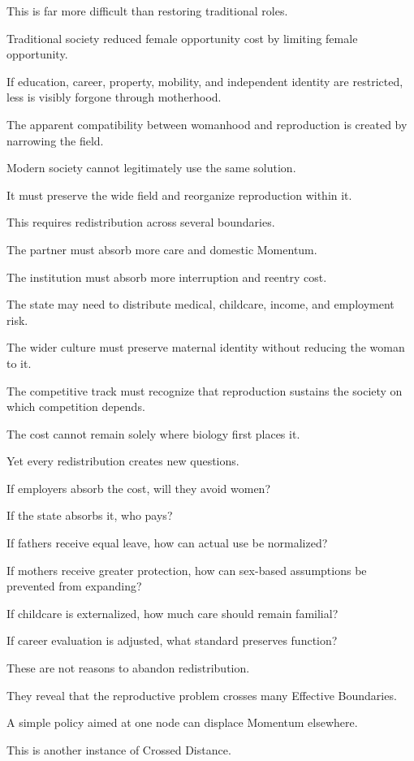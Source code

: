This is far more difficult than restoring traditional roles.

Traditional society reduced female opportunity cost by limiting female opportunity.

If education, career, property, mobility, and independent identity are restricted, less is visibly forgone through motherhood.

The apparent compatibility between womanhood and reproduction is created by narrowing the field.

Modern society cannot legitimately use the same solution.

It must preserve the wide field and reorganize reproduction within it.

This requires redistribution across several boundaries.

The partner must absorb more care and domestic Momentum.

The institution must absorb more interruption and reentry cost.

The state may need to distribute medical, childcare, income, and employment risk.

The wider culture must preserve maternal identity without reducing the woman to it.

The competitive track must recognize that reproduction sustains the society on which competition depends.

The cost cannot remain solely where biology first places it.

Yet every redistribution creates new questions.

If employers absorb the cost, will they avoid women?

If the state absorbs it, who pays?

If fathers receive equal leave, how can actual use be normalized?

If mothers receive greater protection, how can sex-based assumptions be prevented from expanding?

If childcare is externalized, how much care should remain familial?

If career evaluation is adjusted, what standard preserves function?

These are not reasons to abandon redistribution.

They reveal that the reproductive problem crosses many Effective Boundaries.

A simple policy aimed at one node can displace Momentum elsewhere.

This is another instance of Crossed Distance.


